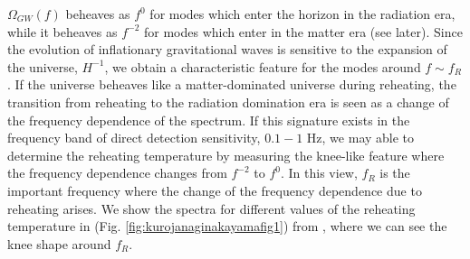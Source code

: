 \documentclass[11pt,a4paper,twoside]{book}
\begin{document}
$\Omega_{GW}(f)$ beheaves  as $ f^{0} $ for modes which enter the horizon in the radiation era, while it beheaves as $ f^{-2} $ for  modes which enter in the matter era (see later). Since the evolution of inflationary gravitational waves is sensitive to the expansion of the universe, $ H^{-1} $, we obtain a characteristic feature for the modes around $ f \sim f_{R} $. If the universe beheaves like a matter-dominated universe during reheating, the transition from reheating to the radiation domination era is seen as a change of the frequency dependence of the spectrum. If this signature exists in the frequency band of direct detection sensitivity, $ 0.1-1 $ Hz, we may able to determine the reheating temperature by measuring the knee-like feature where the frequency dependence changes from $ f^{-2} $ to $ f^{0} $. In this view, $ f_{R} $ is the important frequency where the change of the frequency dependence due to reheating arises. We show the spectra for different values of the reheating temperature in (Fig. \ref{fig:kurojanaginakayamafig1}) from \cite{Chap3:ProspectsForDeterminationWithDetectors}, where we can see the knee shape around $ f_{R} $.
\end{document}
